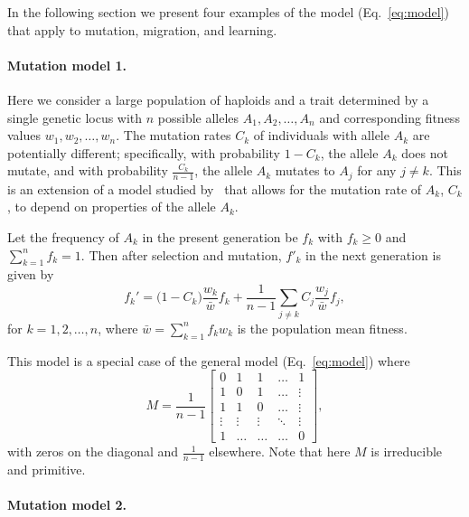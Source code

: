 \documentclass[9pt, a4paper, twocolumn]{extarticle}
\begin{document}
In the following section we present four examples of the model (Eq.~\ref{eq:model}) that apply to mutation, migration, and learning.

\paragraph*{Mutation model 1.}\label{sec:mut_model_1}

Here we consider a large population of haploids and a trait determined by a single genetic locus with $n$ possible alleles $A_1, A_2, \ldots, A_n$ and corresponding fitness values $w_1, w_2, \ldots, w_n$.
The mutation rates $C_k$ of individuals with allele $A_k$ are potentially different;
specifically, with probability $1-C_k$, the allele $A_k$ does not mutate, and with probability $\frac{C_k}{n-1}$, the allele $A_k$ mutates to $A_j$ for any $j \ne k$.
This is an extension of a model studied by~\citet{Altenberg2017} that allows for the mutation rate of $A_k$, $C_k$, to depend on properties of the allele $A_k$.

Let the frequency of $A_k$ in the present generation be $f_k$ with $f_k \ge 0$ and $\sum_{k=1}^{n}{f_k}=1$.
Then after selection and mutation, $f'_k$ in the next generation is given by
\begin{equation}
f_k' = \big(1 - C_k\big) \frac{w_k}{\bar{w}} f_k + \frac{1}{n-1} \sum_{j \ne k}{C_j \frac{w_j}{\bar{w}} f_j},
\label{eq:mutation_model_1}
\end{equation}
for  $k=1, 2, \ldots, n$, where $\bar{w} = \sum_{k=1}^{n}{f_k w_k}$ is the population mean fitness.

This model is a special case of the general model (Eq.~\ref{eq:model}) where
\begin{equation} 
{M} = \frac{1}{n-1} \begin{bmatrix}
0 & 1 & 1 & \ldots & 1 \\
1 & 0 & 1 & \ldots & \vdots \\
1 & 1 & 0 & \ldots & \vdots \\
\vdots & \vdots & \vdots & \ddots & \vdots \\
1 & \ldots & \ldots & \ldots & 0
\end{bmatrix},
\end{equation}
with zeros on the diagonal and $\frac{1}{n-1}$ elsewhere.
Note that here ${M}$ is irreducible and primitive.

\paragraph*{Mutation model 2.}\label{sec:mut_model_2}
\end{document}
